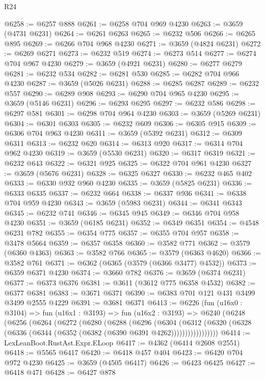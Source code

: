 \begin{lexlean}{R24}
\begin{coremodule}
@6258 := @6257 @888
@6261 := @6258 @704 @969 @4230
@6263 := @3659 (@4731 @6231)
@6264 := @6261 @6263
@6265 := @6232 @506
@6266 := @6265 @895
@6269 := @6266 @704 @968 @4230
@6271 := @3659 (@4824 @6231)
@6272 := @6269 @6271
@6273 := @6232 @519
@6274 := @6273 @514
@6277 := @6274 @704 @967 @4230
@6279 := @3659 (@4921 @6231)
@6280 := @6277 @6279
@6281 := @6232 @534
@6282 := @6281 @530
@6285 := @6282 @704 @966 @4230
@6287 := @3659 (@5026 @6231)
@6288 := @6285 @6287
@6289 := @6232 @557
@6290 := @6289 @908
@6293 := @6290 @704 @965 @4230
@6295 := @3659 (@5146 @6231)
@6296 := @6293 @6295
@6297 := @6232 @586
@6298 := @6297 @581
@6301 := @6298 @704 @964 @4230
@6303 := @3659 (@5269 @6231)
@6304 := @6301 @6303
@6305 := @6232 @609
@6306 := @6305 @915
@6309 := @6306 @704 @963 @4230
@6311 := @3659 (@5392 @6231)
@6312 := @6309 @6311
@6313 := @6232 @620
@6314 := @6313 @920
@6317 := @6314 @704 @962 @4230
@6319 := @3659 (@5530 @6231)
@6320 := @6317 @6319
@6321 := @6232 @643
@6322 := @6321 @925
@6325 := @6322 @704 @961 @4230
@6327 := @3659 (@5676 @6231)
@6328 := @6325 @6327
@6330 := @6232 @465 @402
@6333 := @6330 @932 @960 @4230
@6335 := @3659 (@5825 @6231)
@6336 := @6333 @6335
@6337 := @6232 @664
@6338 := @6337 @936
@6341 := @6338 @704 @959 @4230
@6343 := @3659 (@5983 @6231)
@6344 := @6341 @6343
@6345 := @6232 @741
@6346 := @6345 @945
@6349 := @6346 @704 @958 @4230
@6351 := @3659 (@6185 @6231)
@6352 := @6349 @6351
@6354 := @4548 @6231 @782
@6355 := @6354 @775
@6357 := @6355 @704 @957
@6358 := @3478 @5664
@6359 := @6357 @6358
@6360 := @3582 @771
@6362 := @3579 (@6360 @4363)
@6363 := @3582 @766
@6365 := @3579 (@6363 @4620)
@6366 := @3582 @761
@6371 := @6362 (@6365 (@3579 (@6366 @3477) @4532))
@6373 := @6359 @6371 @4230
@6374 := @3660 @782
@6376 := @3659 (@6374 @6231)
@6377 := @6373 @6376
@6381 := @3611 (@3612 @775 @6358 @4532)
@6382 := @6377 @6381
@6383 := @3671 @6371
@6390 := @6383 @701 @121 @431 @3499 @3499 @2555 @4229
@6391 := @3681 @6371
@6413 := @6226
    (fun (u16x0 : @3104) =>
    fun (u16x1 : @3193) =>
    fun (u16x2 : @3193) =>
    @6240
      (@6248
        (@6256
          (@6264
            (@6272
              (@6280
                (@6288
                  (@6296
                    (@6304
                      (@6312
                        (@6320
                          (@6328 (@6336 (@6344 (@6352 (@6382 (@6390 @6391 @4262)))))))))))))))))
@6414 := LexLeanBoot.RustAst.Expr.ELoop
@6417 := @4362 (@6414 @2608 @2551)
@6418 := @5565 @6417
@6420 := @6418 @457 @404
@6423 := @6420 @704 @972 @4230
@6425 := @3659 (@4505 @6417)
@6426 := @6423 @6425
@6427 := @6418 @471
@6428 := @6427 @878

\end{coremodule}
\end{lexlean}
